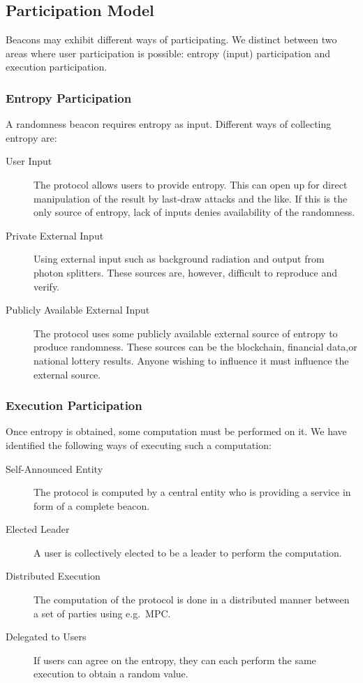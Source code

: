 \subsection{Participation Model}
\label{sub:participation_model}
Beacons may exhibit different ways of participating. We distinct between two areas where user participation is possible: entropy (input) participation and execution participation.

\subsubsection{Entropy Participation}
A randomness beacon requires entropy as input. Different ways of collecting entropy are:
   
\begin{description}
    \item [User Input] The protocol allows users to provide entropy. This can open up for direct manipulation of the result by last-draw attacks and the like. If this is the only source of entropy, lack of inputs denies availability of the randomness.
    \item [Private External Input] Using external input such as background radiation and output from photon splitters. These sources are, however, difficult to reproduce and verify.
    \item [Publicly Available External Input] The protocol uses some publicly available external source of entropy to produce randomness. These sources can be the blockchain, financial data,or national lottery results. Anyone wishing to influence it must influence the external source.
\end{description}

\subsubsection{Execution Participation}
Once entropy is obtained, some computation must be performed on it. We have identified the following ways of executing such a computation:

\begin{description}
    \item[Self-Announced Entity] The protocol is computed by a central entity who is providing a service in form of a complete beacon.
    \item[Elected Leader] A user is collectively elected to be a leader to perform the computation.
    \item[Distributed Execution]
    The computation of the protocol is done in a distributed manner between a set of parties using e.g.\ MPC\@.
    \item[Delegated to Users] If users can agree on the entropy, they can each perform the same execution to obtain a random value.
\end{description}
